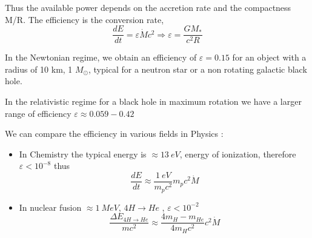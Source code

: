 \documentclass[10pt,a4paper,english,draft]{article}
\begin{document}
Thus the available power depends on the accretion rate and the compactness M/R. The efficiency is the conversion rate,
\begin{equation}
 \frac{dE}{dt} = \varepsilon \dot{M} c^{2} \Rightarrow \varepsilon = \frac{GM_*}{c^{2}R}
\end{equation}

In the Newtonian regime, we obtain an efficiency of $\varepsilon = 0.15$ for an object with a radius of 10 km, 1 $M_{\odot}$, typical for a neutron star or a non rotating galactic black hole.

In the relativistic regime for a black hole in maximum rotation we have a larger range of efficiency $\varepsilon \approx 0.059-0.42$

We can compare the efficiency in various fields in Physics :
\begin{itemize}
  \item In Chemistry the typical energy is $\approx \SI{13}{eV}$, energy of ionization, therefore $\varepsilon < 10^{-8}$ thus
  \begin{equation}
  \frac{dE}{dt} \approx \frac{\SI{1}{eV}}{m_{p}c^{2}} m_{p}c^{2}\dot{M}
  \end{equation}
  \item In nuclear fusion $\approx \SI{1}{MeV}$, $4H \rightarrow He$ , $\varepsilon < 10^{-2}$
  \begin{equation}
  \frac {\Delta E_{4H \rightarrow He}}{mc^{2}} \approx \dfrac{4m_{H}-m_{He}}{4m_{H}c^{2}} c^{2}\dot{M}
  \end{equation}
\end{itemize}
\end{document}
